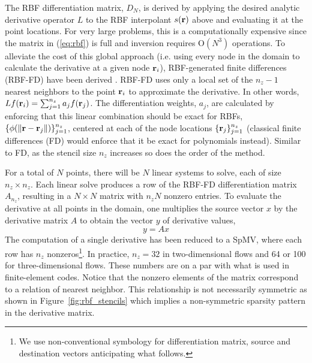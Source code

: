 \documentclass[10pt,conference,compsocconf]{IEEEtran}
\begin{document}
The RBF differentiation matrix, $D_N$, is derived by applying the
desired analytic derivative operator $L$ to the RBF interpolant
$s({\bf r})$ above and evaluating it at the point locations. For very
large problems, this is a computationally expensive since the matrix
in (\ref{eq:rbf}) is full and inversion requires O$(N^3)$
operations. To alleviate the cost of this global approach (i.e. using
every node in the domain to calculate the derivative at a given node
${\bf r}_i$), RBF-generated finite differences (RBF-FD) have been
derived \cite{TAI1,TAI2,SDY02,WrFo06,FoL11,FLBWSC12}. RBF-FD uses only
a local set of the $n_z-1$ nearest neighbors to the point ${\bf r}_i$ to
approximate the derivative. In other words,
$Lf({\bf r}_i)=\sum_{j=1}^{n_z}a_jf({\bf r}_j)$. The differentiation
weights, $a_j$, are calculated by enforcing that this linear
combination should be exact for RBFs,
$\{\phi(\|{\bf r}-{\bf r}_{j}\|)\}_{j=1}^{n_z}$, centered at each of the
node locations $\{{\bf r}_j\}_{j=1}^{n_z}$ (classical finite differences
(FD) would enforce that it be exact for polynomials instead). Similar
to FD, as the stencil size $n_z$ increases so does the order of the
method.

For a total of $N$ points, there will be $N$ linear systems to solve,
each of size $n_z \times n_z$. Each linear solve produces a row of the
RBF-FD differentiation matrix $A_{n_z}$, resulting in a $N \times N$
matrix with $n_zN$ nonzero entries. To evaluate the derivative at all
points in the domain, one multiplies the source vector $x$ by the 
derivative matrix $A$ to obtain the vector $y$ of derivative values, 
$$
  y = A x
$$
The computation of a single derivative has been reduced to a SpMV, 
where each row has $n_z$ nonzeros\footnote{We use non-conventional 
symbology for differentiation matrix, source and destination vectors
anticipating what follows.}. 
In practice, $n_z=32$ in two-dimensional flows and 64 or 100 for
three-dimensional flows. These numbers are on a par with what is used in
finite-element codes. Notice that the nonzero elements of the matrix
correspond to a relation of nearest neighbor. This relationship is not
necessarily symmetric as shown in Figure~\ref{fig:rbf_stencils} which
implies a non-symmetric sparsity pattern in the derivative matrix. 
\end{document}
